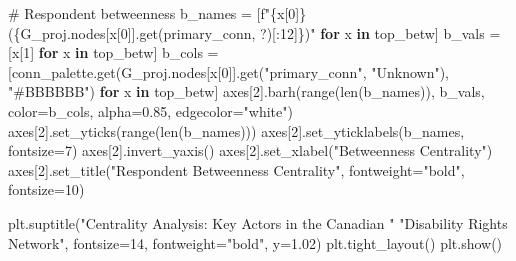 \documentclass[
  letterpaper,
  DIV=11,
  numbers=noendperiod]{scrartcl}
\newenvironment{Shaded}{\begin{snugshade}}{\end{snugshade}}
\newcommand{\BuiltInTok}[1]{\textcolor[rgb]{0.00,0.23,0.31}{#1}}
\newcommand{\CommentTok}[1]{\textcolor[rgb]{0.37,0.37,0.37}{#1}}
\newcommand{\ControlFlowTok}[1]{\textcolor[rgb]{0.00,0.23,0.31}{\textbf{#1}}}
\newcommand{\DecValTok}[1]{\textcolor[rgb]{0.68,0.00,0.00}{#1}}
\newcommand{\FloatTok}[1]{\textcolor[rgb]{0.68,0.00,0.00}{#1}}
\newcommand{\KeywordTok}[1]{\textcolor[rgb]{0.00,0.23,0.31}{\textbf{#1}}}
\newcommand{\NormalTok}[1]{\textcolor[rgb]{0.00,0.23,0.31}{#1}}
\newcommand{\OperatorTok}[1]{\textcolor[rgb]{0.37,0.37,0.37}{#1}}
\newcommand{\SpecialCharTok}[1]{\textcolor[rgb]{0.37,0.37,0.37}{#1}}
\newcommand{\SpecialStringTok}[1]{\textcolor[rgb]{0.13,0.47,0.30}{#1}}
\newcommand{\StringTok}[1]{\textcolor[rgb]{0.13,0.47,0.30}{#1}}
\begin{document}
\begin{Shaded}
\begin{Highlighting}[]
\CommentTok{\# Respondent betweenness}
\NormalTok{b\_names }\OperatorTok{=}\NormalTok{ [}\SpecialStringTok{f"}\SpecialCharTok{\{}\NormalTok{x[}\DecValTok{0}\NormalTok{]}\SpecialCharTok{\}}\SpecialStringTok{ (}\SpecialCharTok{\{}\NormalTok{G\_proj}\SpecialCharTok{.}\NormalTok{nodes[x[}\DecValTok{0}\NormalTok{]]}\SpecialCharTok{.}\NormalTok{get(}\StringTok{\textquotesingle{}primary\_conn\textquotesingle{}}\NormalTok{, }\StringTok{\textquotesingle{}?\textquotesingle{}}\NormalTok{)[:}\DecValTok{12}\NormalTok{]}\SpecialCharTok{\}}\SpecialStringTok{)"}
           \ControlFlowTok{for}\NormalTok{ x }\KeywordTok{in}\NormalTok{ top\_betw]}
\NormalTok{b\_vals }\OperatorTok{=}\NormalTok{ [x[}\DecValTok{1}\NormalTok{] }\ControlFlowTok{for}\NormalTok{ x }\KeywordTok{in}\NormalTok{ top\_betw]}
\NormalTok{b\_cols }\OperatorTok{=}\NormalTok{ [conn\_palette.get(G\_proj.nodes[x[}\DecValTok{0}\NormalTok{]].get(}\StringTok{"primary\_conn"}\NormalTok{,}
          \StringTok{"Unknown"}\NormalTok{), }\StringTok{"\#BBBBBB"}\NormalTok{) }\ControlFlowTok{for}\NormalTok{ x }\KeywordTok{in}\NormalTok{ top\_betw]}
\NormalTok{axes[}\DecValTok{2}\NormalTok{].barh(}\BuiltInTok{range}\NormalTok{(}\BuiltInTok{len}\NormalTok{(b\_names)), b\_vals, color}\OperatorTok{=}\NormalTok{b\_cols, alpha}\OperatorTok{=}\FloatTok{0.85}\NormalTok{,}
\NormalTok{             edgecolor}\OperatorTok{=}\StringTok{"white"}\NormalTok{)}
\NormalTok{axes[}\DecValTok{2}\NormalTok{].set\_yticks(}\BuiltInTok{range}\NormalTok{(}\BuiltInTok{len}\NormalTok{(b\_names)))}
\NormalTok{axes[}\DecValTok{2}\NormalTok{].set\_yticklabels(b\_names, fontsize}\OperatorTok{=}\DecValTok{7}\NormalTok{)}
\NormalTok{axes[}\DecValTok{2}\NormalTok{].invert\_yaxis()}
\NormalTok{axes[}\DecValTok{2}\NormalTok{].set\_xlabel(}\StringTok{"Betweenness Centrality"}\NormalTok{)}
\NormalTok{axes[}\DecValTok{2}\NormalTok{].set\_title(}\StringTok{"Respondent Betweenness Centrality"}\NormalTok{,}
\NormalTok{                  fontweight}\OperatorTok{=}\StringTok{"bold"}\NormalTok{, fontsize}\OperatorTok{=}\DecValTok{10}\NormalTok{)}

\NormalTok{plt.suptitle(}\StringTok{"Centrality Analysis: Key Actors in the Canadian "}
             \StringTok{"Disability Rights Network"}\NormalTok{,}
\NormalTok{             fontsize}\OperatorTok{=}\DecValTok{14}\NormalTok{, fontweight}\OperatorTok{=}\StringTok{"bold"}\NormalTok{, y}\OperatorTok{=}\FloatTok{1.02}\NormalTok{)}
\NormalTok{plt.tight\_layout()}
\NormalTok{plt.show()}
\end{Highlighting}
\end{Shaded}
\end{document}

